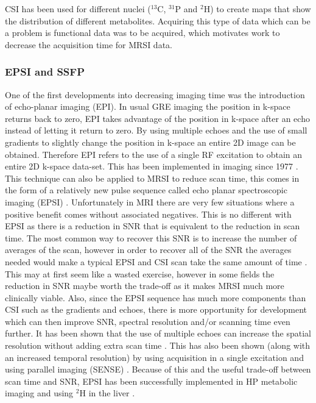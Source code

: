 \documentclass[class=article, crop=false]{standalone}
\begin{document}
CSI has been used for different nuclei ($^{13}$C, $^{31}$P and $^2$H) to create maps that show the distribution of different metabolites. Acquiring this type of data which can be a problem is functional data was to be acquired, which motivates work to decrease the acquisition time for MRSI data.

\subsubsection{EPSI and SSFP}

One of the first developments into decreasing imaging time was the introduction of echo-planar imaging (EPI). In usual GRE imaging the position in k-space returns back to zero, EPI takes advantage of the position in k-space after an echo instead of letting it return to zero. By using multiple echoes and the use of small gradients to slightly change the position in k-space an entire 2D image can be obtained. Therefore EPI refers to the use of a single RF excitation to obtain an entire 2D k-space data-set. This has been implemented in imaging since 1977 \cite{Mansfield1977Multi-planarEchoes}. This technique can also be applied to MRSI to reduce scan time, this comes in the form of a relatively new pulse sequence called echo planar spectroscopic imaging (EPSI) \cite{Mulkern2001EchoImaging}. Unfortunately in MRI there are very few situations where a positive benefit comes without associated negatives. This is no different with EPSI as there is a reduction in SNR that is equivalent to the reduction in scan time. The most common way to recover this SNR is to increase the number of averages of the scan, however in order to recover all of the SNR the averages needed would make a typical EPSI and CSI scan take the same amount of time \cite{Mulkern2001EchoImaging}. This may at first seem like a wasted exercise, however in some fields the reduction in SNR maybe worth the trade-off as it makes MRSI much more clinically viable. Also, since the EPSI sequence has much more components than CSI such as the gradients and echoes, there is more opportunity for development which can then improve SNR, spectral resolution and/or scanning time even further. It has been shown that the use of multiple echoes can increase the spatial resolution without adding extra scan time \cite{Furuyama2011Multi-echo-basedScanner}. This has also been shown (along with an increased temporal resolution) by using acquisition in a single excitation and using parallel imaging (SENSE) \cite{Posse2009Single-shotImaging}. Because of this and the useful trade-off between scan time and SNR, EPSI has been successfully implemented in HP metabolic imaging \cite{Topping2020AcquisitionNuclei,Eldirdiri2018DevelopmentScanner} and using $^2$H in the liver \cite{Min2023Deuterium7T}.
\end{document}
